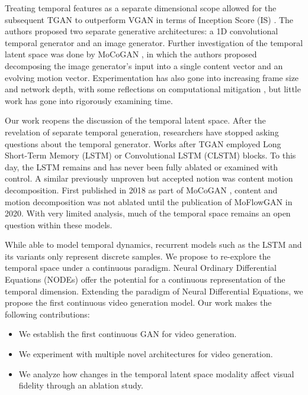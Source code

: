 \documentclass[tablecaption=bottom,pmlr]{jmlr}
\begin{document}
Treating temporal features as a separate dimensional scope allowed for the subsequent TGAN \citep{tgan} to outperform VGAN in terms of Inception Score (IS) \citep{inceptionscore}. The authors proposed two separate generative architectures: a 1D convolutional temporal generator and an image generator. Further investigation of the temporal latent space was done by MoCoGAN \citep{mocogan}, in which the authors proposed decomposing the image generator's input into a single content vector and an evolving motion vector. Experimentation has also gone into increasing frame size and network depth, with some reflections on computational mitigation \citep{tganv2,dvdgan,moflowgan}, but little work has gone into rigorously examining time.

Our work reopens the discussion of the temporal latent space. After the revelation of separate temporal generation, researchers have stopped asking questions about the temporal  generator. Works after TGAN employed Long Short-Term Memory (LSTM) \citep{lstm} or Convolutional LSTM (CLSTM) \citep{clstm} blocks. To this day, the LSTM remains and has never been fully ablated or examined with control. A similar previously unproven but accepted notion was content motion decomposition. First published in 2018 as part of MoCoGAN \citep{mocogan}, content and motion decomposition was not ablated until the publication of MoFlowGAN \citep{moflowgan} in 2020. With very limited analysis, much of the temporal space remains an open question within these models.

While able to model temporal dynamics, recurrent models such as the LSTM and its variants only represent discrete samples. We propose to re-explore the temporal space under a continuous paradigm. Neural Ordinary Differential Equations (NODEs) \citep{neuralode} offer the potential for a continuous representation of the temporal dimension. Extending the paradigm of Neural Differential Equations, we propose the first continuous video generation model.  Our work makes the following contributions:

\begin{itemize}
    \item We establish the first continuous GAN for video generation.
    \item We experiment with multiple novel architectures for video generation.
    \item We analyze how changes in the temporal latent space modality affect visual fidelity through an ablation study.
\end{itemize}
\end{document}
